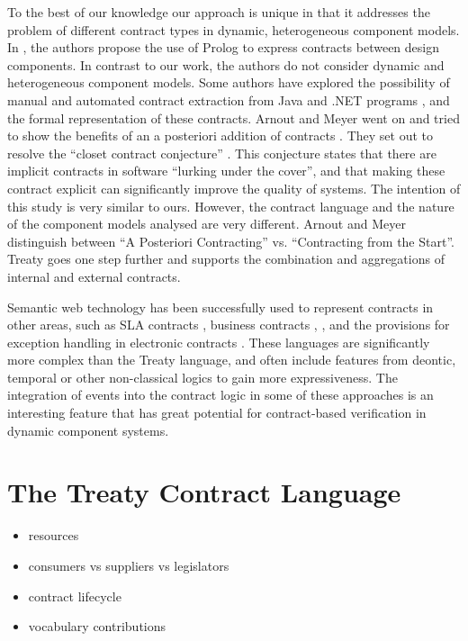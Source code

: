 \documentclass{llncs}
\begin{document}
To the best of our knowledge our approach is unique in that it addresses the problem of different contract types in dynamic, heterogeneous component models. In \cite{Dong2003}, the authors propose the use of Prolog to express contracts between design components. In contrast to our work, the authors do not consider dynamic and heterogeneous component models. Some authors have explored the possibility of manual and automated contract extraction from Java \cite{Henkel03,MilanovicMalek2004} and .NET programs \cite{ArnoutMeyer2003a}, and the formal representation of these contracts. Arnout and Meyer went on and tried to show the benefits of an a posteriori addition of contracts \cite{ArnoutMeyer2003b}. They set out to resolve the ``closet contract
conjecture'' \cite{ArnoutMeyer2003b}. This conjecture states that there are implicit contracts in software ``lurking under the cover'', and that making
these contract explicit can significantly improve the quality of systems. The intention of this study is very similar to ours. However, the contract language and the nature of the component models analysed are very different. Arnout and Meyer distinguish between ``A Posteriori Contracting'' vs. ``Contracting from the Start''. Treaty goes one step further and supports the combination and aggregations of internal and external contracts. 

Semantic web technology has been successfully used to represent contracts in other areas, such as SLA contracts \cite{PaschkeDietrich2005}, business
contracts \cite{Linington04}, \cite{Governatori06} ,\cite{Governatori05} and the provisions for exception handling in electronic contracts \cite{SweetDeal}. These languages are significantly more complex than the Treaty language, and often include features from deontic, temporal or other non-classical logics to gain more expressiveness. The integration of events into the contract logic in some of these approaches is an interesting feature that has great potential for contract-based verification in dynamic component systems. 



\section{The Treaty Contract Language}

\begin{itemize}
\item resources
\item consumers vs suppliers vs legislators
\item contract lifecycle
\item vocabulary contributions
\end{itemize}
\end{document}
